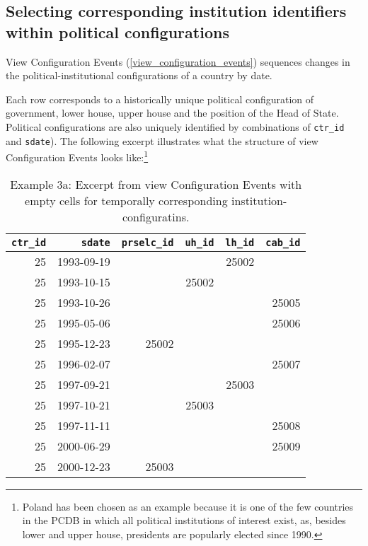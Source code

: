 \subsection{Selecting corresponding institution identifiers within political configurations}\label{trg_mv_config_ev_prv_ids}
View Configuration Events (\ref{view_configuration_events}) sequences changes in the political-institutional configurations of a country by date.

Each row corresponds to a historically unique political configuration of government, lower house, upper house and the position of the Head of State. Political configurations are also uniquely identified by combinations of \texttt{\footnotesize ctr\_id} and \texttt{\footnotesize sdate}). 
The following excerpt illustrates what the structure of view Configuration Events looks like:\footnote{Poland has been chosen as an example because it is one of the few countries in the PCDB in which all political institutions of interest exist, as, besides lower and upper house, presidents are popularly elected since 1990.}

\begin{table}[h!]
\centering\footnotesize
\caption*{Example 3a: Excerpt from view Configuration Events with empty cells for temporally corresponding institution-configuratins.}
\begin{tabular}{r r r r r r}
\tabularnewline\toprule\toprule
\multicolumn{1}{r}{\texttt{\smallfont ctr\_id}}	&
\multicolumn{1}{r}{\texttt{\smallfont sdate}}	&	
\multicolumn{1}{r}{\texttt{\smallfont prselc\_id}}	&
\multicolumn{1}{r}{\texttt{\smallfont uh\_id}}	&
\multicolumn{1}{r}{\texttt{\smallfont lh\_id}}	&	
\multicolumn{1}{r}{\texttt{\smallfont cab\_id}}	\\\midrule
25	&	1993-09-19	&		&		&	25002	&		\\
25	&	1993-10-15	&		&	25002	&		&		\\
25	&	1993-10-26	&		&		&		&	25005	\\
25	&	1995-05-06	&		&		&		&	25006	\\
25	&	1995-12-23	&	25002	&		&		&		\\
25	&	1996-02-07	&		&		&		&	25007	\\
25	&	1997-09-21	&		&		&	25003	&		\\
25	&	1997-10-21	&		&	25003	&		&		\\
25	&	1997-11-11	&		&		&		&	25008	\\
25	&	2000-06-29	&		&		&		&	25009	\\
25	&	2000-12-23	&	25003	&		&		&		\\\bottomrule\bottomrule
\end{tabular}
\end{table}

